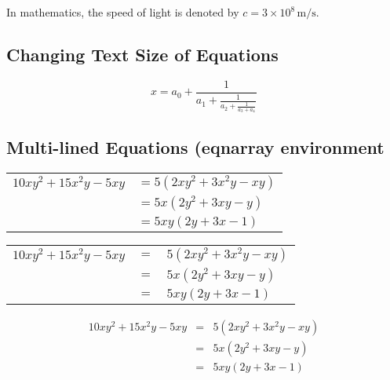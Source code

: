 \documentclass{article}
\begin{document}

In mathematics, the speed of light is denoted by $c = 3 \times 10^8 \, \mathrm{m/s}$.

\subsection{Changing Text Size of Equations}

\begin{equation} x = a_0 + \frac{1}{a_1 + \frac{1}{a_2 + \frac{1}{a_3 + a_4}}}
\end{equation}
\vspace{10pt}


\subsection{Multi-lined Equations (eqnarray environment}

\begin{tabular}{ r l }
\(10xy^2+15x^2y-5xy\) & \(= 5\left(2xy^2+3x^2y-xy\right)\)\\
& \(= 5x\left(2y^2+3xy-y\right)\) \\
& \(= 5xy\left(2y+3x-1\right)\)
\end{tabular}
\vspace{10pt}

\begin{tabular}{ r c l }
\(10xy^2+15x^2y-5xy\) & \(=\) & \(5\left(2xy^2+3x^2y-xy\right)\) \\
& \(=\) & \(5x\left(2y^2+3xy-y\right)\) \\
& \(=\) & \(5xy\left(2y+3x-1\right)\)
\end{tabular}
\vspace{10pt}

\begin{eqnarray}
10xy^2+15x^2y-5xy & = & 5\left(2xy^2+3x^2y-xy\right) \nonumber \\
& = & 5x\left(2y^2+3xy-y\right) \nonumber \\
& = & 5xy\left(2y+3x-1\right)
\end{eqnarray}
\vspace{10pt}
\end{document}
